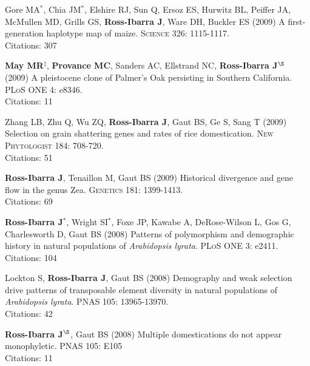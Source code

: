 \documentclass[letterpaper]{article}
\begin{document}
\begin{etaremune}
\item Gore MA$^*$, Chia JM$^*$, Elshire RJ, Sun Q, Ersoz ES, Hurwitz BL, Peiffer JA, McMullen MD, Grills GS, {\bf Ross-Ibarra J}, Ware DH, Buckler ES (2009) A first-generation haplotype map of maize.  \textsc{Science 326}: 1115-1117.
\\Citations: 307\\

\item {\bf May MR}$^\ddagger$, {\bf Provance MC}, Sanders AC, Ellstrand NC, {\bf Ross-Ibarra J}$^\S$ (2009) A pleistocene clone of Palmer's Oak persisting in Southern California.  \textsc{PLoS ONE} 4: e8346.
\\Citations: 11\\

\item Zhang LB, Zhu Q, Wu ZQ, {\bf Ross-Ibarra J}, Gaut BS, Ge S, Sang T (2009) Selection on grain shattering genes and rates of rice domestication.  \textsc{New Phytologist} 184: 708-720.
\\Citations: 51\\

\item {\bf Ross-Ibarra J}, Tenaillon M, Gaut BS (2009) Historical divergence and gene flow in the genus Zea.  \textsc{Genetics} 181: 1399-1413.
\\Citations: 69\\

\item {\bf Ross-Ibarra J}$^*$, Wright SI$^*$, Foxe JP, Kawabe A, DeRose-Wilson L, Gos G, Charlesworth D, Gaut BS (2008) Patterns of polymorphism and demographic history in natural populations of \emph{Arabidopsis lyrata}.  \textsc{PLoS ONE} 3: e2411.
\\Citations: 104\\

\item Lockton S, {\bf Ross-Ibarra J}, Gaut BS (2008) Demography and weak selection drive patterns of transposable element diversity in natural populations of \emph{Arabidopsis lyrata}. PNAS 105: 13965-13970.
\\Citations: 42\\

\item {\bf Ross-Ibarra J}$^\S$, Gaut BS (2008) Multiple domestications do not appear monophyletic. PNAS 105: E105
\\Citations: 11\\


\end{etaremune}
\end{document}
